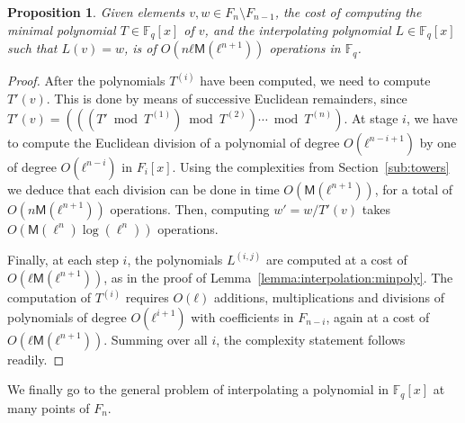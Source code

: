 \documentclass{lms}
\newtheorem{prop}[thm]{Proposition}
\def\cout#1{\mathsf{#1}}
\newcommand{\F}{\mathbb{F}}
\newcommand{\MM}{\cout{M}}
\begin{document}
\begin{prop}
  Given elements $v,w∈F_n\setminus F_{n-1}$, the cost of computing the
  minimal polynomial $T∈\F_q[x]$ of $v$, and the interpolating
  polynomial $L∈\F_q[x]$ such that $L(v)=w$, is of $O(nℓ\MM(ℓ^{n+1}))$
  operations in $\F_q$.
\end{prop}
\begin{proof}
  After the polynomials $T^{(i)}$ have been computed, we need to
  compute $T'(v)$. This is done by means of successive Euclidean
  remainders, since
  $T'(v) = (((T' \bmod T^{(1)}) \bmod T^{(2)}) \cdots \bmod T^{(n)})$.
  At stage $i$, we have to compute the Euclidean division of a
  polynomial of degree $O(ℓ^{n-i+1})$ by one of degree $O(ℓ^{n-i})$ in
  $F_i[x]$. Using the complexities from Section~\ref{sub:towers} we
  deduce that each division can be done in time $O(\MM(ℓ^{n+1}))$, for
  a total of $O(n\MM(ℓ^{n+1}))$ operations. Then, computing
  $w' = w/T'(v)$ takes $O(\MM(\ell^n)\log(\ell^n))$ operations.

  Finally, at each step $i$, the polynomials $L^{(i,j)}$ are computed
  at a cost of $O(ℓ\MM(ℓ^{n+1}))$, as in the proof of
  Lemma~\ref{lemma:interpolation:minpoly}.  The computation of
  $T^{(i)}$ requires $O(ℓ)$ additions, multiplications and divisions
  of polynomials of degree $O(ℓ^{i+1})$ with coefficients in
  $F_{n-i}$, again at a cost of $O(ℓ\MM(ℓ^{n+1}))$. Summing over all
  $i$, the complexity statement follows readily.
\end{proof}

We finally go to the general problem of interpolating a polynomial in
$\F_q[x]$ at many points of $F_n$.
\end{document}
